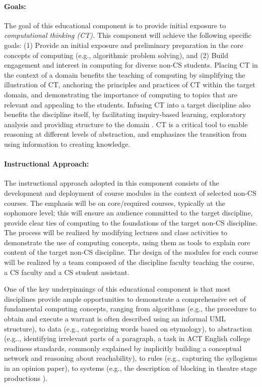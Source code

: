 \paragraph{Goals:} The goal of this educational component is to provide initial exposure to \emph{computational thinking (CT).} This component will achieve the following specific goals: (1) Provide an initial exposure and preliminary preparation in the core concepts of computing (e.g., algorithmic problem solving), and
(2) Build engagement and interest in computing for diverse non-CS students.
Placing CT in the context of a domain benefits the teaching of computing by simplifying the illustration of CT, anchoring the principles and practices of CT within the target domain, and demonstrating the importance of computing to topics that are relevant and appealing to the students.
Infusing CT into a target discipline also benefits the discipline itself, by  facilitating inquiry-based learning, exploratory analysis and providing structure to the
domain \cite{ep71,ep150}.  CT is a critical tool to enable reasoning at different levels of abstraction, and emphasizes the transition from using information to creating knowledge.

\paragraph{Instructional Approach:}
The instructional approach adopted in this component consists of the development and deployment of course modules in the context of selected non-CS courses. The emphasis will be on core/required courses, typically at the sophomore level; this will ensure an audience committed to the target discipline, provide clear ties of computing to the foundations of the target non-CS discipline. 
The  process will be realized by modifying lectures and class activities to demonstrate the use of computing concepts, using them as tools to explain core content of the target non-CS discipline. The design of the modules for each course will be realized by a team composed of the discipline faculty teaching the course, a CS faculty and a CS student assistant.  

One of the key underpinnings of this educational component
is that most disciplines  provide ample opportunities to demonstrate 
a comprehensive set of fundamental computing concepts, ranging from algorithms (e.g., the procedure to obtain and execute a warrant is often  described using an informal UML structure), to data (e.g., categorizing words based on
etymology), to abstraction (e.g.., identifying irrelevant
parts of a paragraph, a task in ACT English college
readiness standards, commonly explained by implicitly
building a conceptual network and reasoning about
reachability), to rules (e.g., capturing the syllogisms in
an opinion paper), to systems (e.g., the description of
blocking in theatre stage productions \cite{ep115}).

